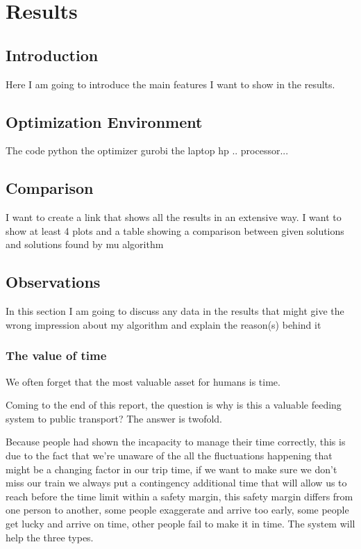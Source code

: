 \documentclass{article}
\begin{document}
\section{Results}
\label{sec:results}
\subsection{Introduction}
Here I am going to introduce the main features I want to show in the results.

\subsection{Optimization Environment}
The code python
the optimizer gurobi
the laptop hp .. processor...


\subsection{Comparison}

I want to create a link that shows all the results in an extensive way.
I want to show at least 4 plots and a table showing a comparison between given solutions and solutions found by mu algorithm

\subsection{Observations}
In this section I am going to discuss any data in the results that might give the wrong impression about my algorithm and explain the reason(s) behind it 


\subsubsection*{The value of time}

\begin{flushright}
We often forget that the most valuable asset for humans is time.
\end{flushright}

Coming to the end of this report, the question is why is this a valuable feeding system to public transport?
The answer is twofold. 

Because people had shown the incapacity to manage their time correctly, this is due to the fact that we\rq{re} unaware of the all the fluctuations happening that might be a changing factor in our trip time, if we want to make sure we don\rq{t} miss our train we always put a contingency additional time that will allow us to reach before the time limit within a safety margin, this safety margin differs from one person to another, some people exaggerate and arrive too early, some people get lucky and arrive on time, other people fail to 
make it in time. The system will help the three types. 
\end{document}
